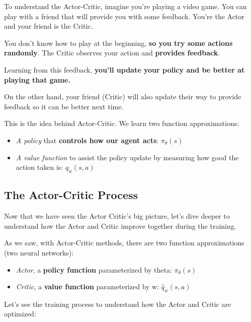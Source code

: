 \documentclass[11pt,a4paper]{article}
\begin{document}
To understand the Actor-Critic, imagine you're playing a video game. You can play with a friend that will provide you with some feedback. You're the Actor and your friend is the Critic.


You don't know how to play at the beginning, \textbf{so you try some actions randomly}. The Critic observes your action and \textbf{provides feedback}.

Learning from this feedback, \textbf{you'll update your policy and be better at playing that game.}

On the other hand, your friend (Critic) will also update their way to provide feedback so it can be better next time.

This is the idea behind Actor-Critic. We learn two function approximations:

\begin{itemize}
\item
  \emph{A policy} that \textbf{controls how our agent acts}: \(\pi_{\theta}(s)\)
\item
  \emph{A value function} to assist the policy update by measuring how good the action taken is: \(\hat{q}_{w}(s,a)\)
\end{itemize}

\subsection{The Actor-Critic Process}\label{the-actor-critic-process}

Now that we have seen the Actor Critic's big picture, let's dive deeper to understand how the Actor and Critic improve together during the training.

As we saw, with Actor-Critic methods, there are two function approximations (two neural networks):

\begin{itemize}
\tightlist
\item
  \emph{Actor}, a \textbf{policy function} parameterized by theta: \(\pi_{\theta}(s)\)
\item
  \emph{Critic}, a \textbf{value function} parameterized by w: \(\hat{q}_{w}(s,a)\)
\end{itemize}

Let's see the training process to understand how the Actor and Critic are optimized:
\end{document}
